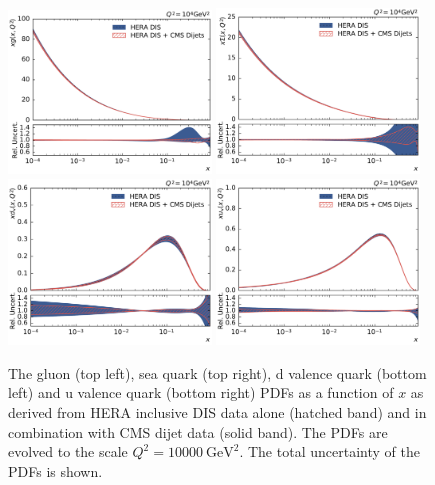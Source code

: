\begin{figure}[tbp]
  \centering
  \includegraphics[width=0.48\textwidth]{figures/pdf_constraints/pdfcomp_direct_0_10000.pdf}\hfill%
  \includegraphics[width=0.48\textwidth]{figures/pdf_constraints/pdfcomp_direct_9_10000.pdf}
  \includegraphics[width=0.48\textwidth]{figures/pdf_constraints/pdfcomp_direct_7_10000.pdf}\hfill%
  \includegraphics[width=0.48\textwidth]{figures/pdf_constraints/pdfcomp_direct_8_10000.pdf}
  \caption[Direct comparison of gluon and quark PDFs]{The gluon (top left), sea
  quark (top right), d valence quark (bottom left) and u valence quark (bottom
right) PDFs as a function of $x$ as derived from HERA inclusive DIS data
alone (hatched band) and in combination with CMS dijet data (solid band). The PDFs
are evolved to the scale $Q^2 = \SI{10000}{\GeV \squared}$. The total
uncertainty of the PDFs is shown.}
\label{fig:pdfconstraints:direct:10000}
\end{figure}
